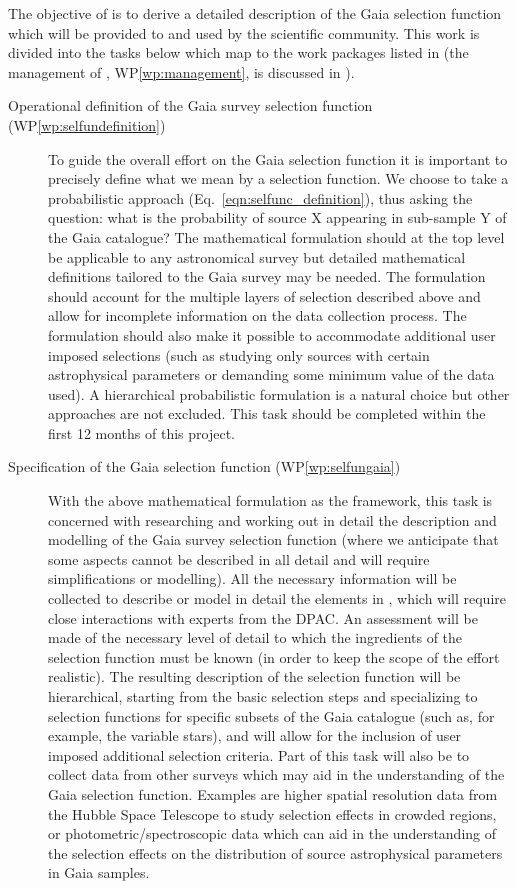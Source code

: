 The objective of {\acro} is to derive a detailed description of the Gaia selection function which will be provided to and used by the scientific community. This work is divided into the tasks below which map to the work packages listed in  (the management of {\acro}, WP\ref{wp:management}, is discussed in ).

\begin{description}
    \item[Operational definition of the Gaia survey selection function (WP\ref{wp:selfundefinition})] To guide the overall effort on the Gaia selection function it is important to precisely define what we mean by a selection function. We choose to take a probabilistic approach (Eq.~\ref{eqn:selfunc_definition}), thus asking the question: what is the probability of source X appearing in sub-sample Y of the Gaia catalogue? The mathematical formulation should at the top level be applicable to any astronomical survey but detailed mathematical definitions tailored to the Gaia survey may be needed. The formulation should account for the multiple layers of selection described above and allow for incomplete information on the data collection process. The formulation should also make it possible to accommodate additional user imposed selections (such as studying only sources with certain astrophysical parameters or demanding some minimum value of the data used). A hierarchical probabilistic formulation is a natural choice but other approaches are not excluded. This task should be completed within the first 12 months of this project.
    \item[Specification of the Gaia selection function (WP\ref{wp:selfungaia})] With the above mathematical formulation as the framework, this task is concerned with researching and working out in detail the description and modelling of the Gaia survey selection function (where we anticipate that some aspects cannot be described in all detail and will require simplifications or modelling). All the necessary information will be collected to describe or model in detail the elements in , which will require close interactions with experts from the DPAC. An assessment will be made of the necessary level of detail to which the ingredients of the selection function must be known (in order to keep the scope of the effort realistic). The resulting description of the selection function will be hierarchical, starting from the basic selection steps and specializing to selection functions for specific subsets of the Gaia catalogue (such as, for example, the variable stars), and will allow for the inclusion of user imposed additional selection criteria. Part of this task will also be to collect data from other surveys which may aid in the understanding of the Gaia selection function. Examples are higher spatial resolution data from the Hubble Space Telescope to study selection effects in crowded regions, or photometric/spectroscopic data which can aid in the understanding of the selection effects on the distribution of source astrophysical parameters in Gaia samples.

\end{description}
